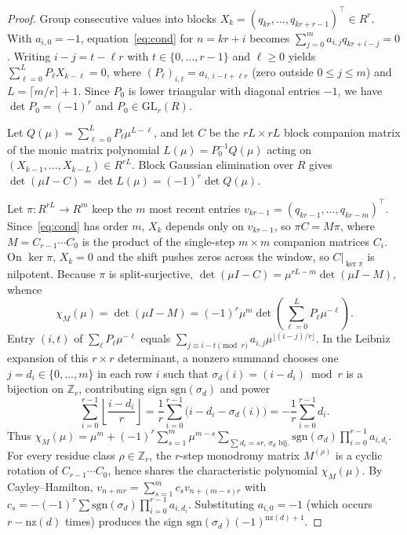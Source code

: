 \documentclass[11pt]{article}
\theoremstyle{remark}
\begin{document}
\begin{proof}
Group consecutive values into blocks $X_k = (q_{kr}, \dots, q_{kr+r-1})^\top \in R^r$. With $a_{i,0} = -1$, equation~\eqref{eq:cond} for $n = kr + i$ becomes $\sum_{j=0}^{m} a_{i,j} q_{kr+i-j} = 0$. Writing $i - j = t - \ell r$ with $t \in \{0, \dots, r-1\}$ and $\ell \ge 0$ yields $\sum_{\ell=0}^{L} P_\ell X_{k-\ell} = 0$, where $(P_\ell)_{i,t} = a_{i,\, i-t+\ell r}$ (zero outside $0 \le j \le m$) and $L = \lceil m/r \rceil + 1$. Since $P_0$ is lower triangular with diagonal entries $-1$, we have $\det P_0 = (-1)^r$ and $P_0 \in \mathrm{GL}_r(R)$.

Let $Q(\mu) = \sum_{\ell=0}^{L} P_\ell \mu^{L-\ell}$, and let $C$ be the $rL \times rL$ block companion matrix of the monic matrix polynomial $L(\mu) = P_0^{-1} Q(\mu)$ acting on $(X_{k-1}, \dots, X_{k-L}) \in R^{rL}$. Block Gaussian elimination over $R$ gives $\det(\mu I - C) = \det L(\mu) = (-1)^r \det Q(\mu)$.

Let $\pi : R^{rL} \to R^m$ keep the $m$ most recent entries $v_{kr-1} = (q_{kr-1}, \dots, q_{kr-m})^\top$. Since~\eqref{eq:cond} has order $m$, $X_k$ depends only on $v_{kr-1}$, so $\pi C = M \pi$, where $M = C_{r-1} \cdots C_0$ is the product of the single-step $m \times m$ companion matrices $C_i$. On $\ker \pi$, $X_k = 0$ and the shift pushes zeros across the window, so $C|_{\ker \pi}$ is nilpotent. Because $\pi$ is split-surjective, $\det(\mu I - C) = \mu^{rL-m} \det(\mu I - M)$, whence
\[
\chi_M(\mu) = \det(\mu I - M) = (-1)^r \mu^m \det\!\left(\sum_{\ell=0}^{L} P_\ell \mu^{-\ell}\right).
\]
Entry $(i, t)$ of $\sum_\ell P_\ell \mu^{-\ell}$ equals $\sum_{j \equiv i-t \pmod r} a_{i,j} \mu^{\lfloor (i-j)/r \rfloor}$. In the Leibniz expansion of this $r \times r$ determinant, a nonzero summand chooses one $j = d_i \in \{0, \dots, m\}$ in each row $i$ such that $\sigma_d(i) = (i - d_i) \bmod r$ is a bijection on $\mathbb{Z}_r$, contributing sign $\mathrm{sgn}(\sigma_d)$ and power
\[
\sum_{i=0}^{r-1} \left\lfloor \frac{i - d_i}{r} \right\rfloor = \frac{1}{r} \sum_{i=0}^{r-1} \bigl(i - d_i - \sigma_d(i)\bigr) = -\frac{1}{r} \sum_{i=0}^{r-1} d_i.
\]
Thus $\chi_M(\mu) = \mu^m + (-1)^r \sum_{s=1}^{m} \mu^{m-s} \sum_{\sum d_i = sr,\, \sigma_d \text{ bij.}} \mathrm{sgn}(\sigma_d) \prod_{i=0}^{r-1} a_{i, d_i}$. For every residue class $\rho \in \mathbb{Z}_r$, the $r$-step monodromy matrix $M^{(\rho)}$ is a cyclic rotation of $C_{r-1} \cdots C_0$, hence shares the characteristic polynomial $\chi_M(\mu)$. By Cayley--Hamilton, $v_{n+mr} = \sum_{s=1}^{m} c_s v_{n+(m-s)r}$ with $c_s = -(-1)^r \sum \mathrm{sgn}(\sigma_d) \prod_{i=0}^{r-1} a_{i, d_i}$. Substituting $a_{i,0} = -1$ (which occurs $r - \mathrm{nz}(d)$ times) produces the sign $\mathrm{sgn}(\sigma_d)(-1)^{\mathrm{nz}(d)+1}$.
\end{proof}
\end{document}
